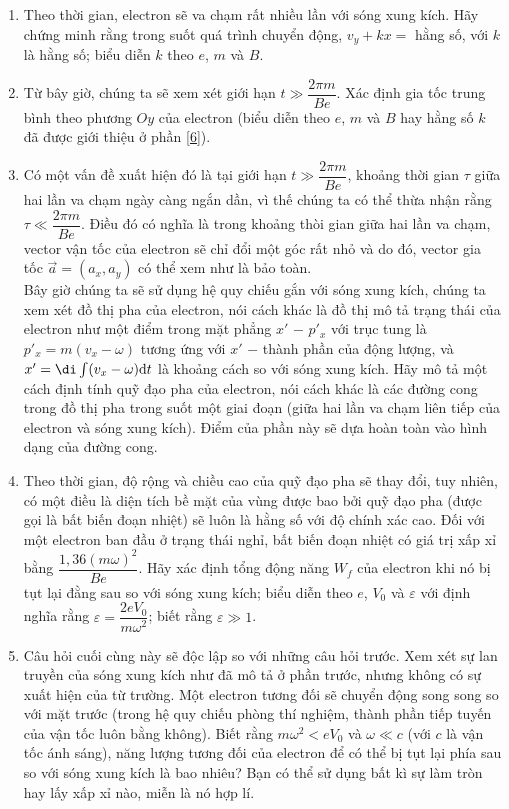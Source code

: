 \begin{vd}
\begin{enumerate}[1)]
    \item Theo thời gian, electron sẽ va chạm rất nhiều lần với sóng xung kích. Hãy chứng minh rằng trong suốt quá trình chuyển động, $v_{y}+kx=$ hằng số, với $k$ là hằng số; biểu diễn $k$ theo $e$, $m$ và $B$.$\label{6}$
    \item Từ bây giờ, chúng ta sẽ xem xét giới hạn $t\gg \dfrac{2\pi m}{Be}$. Xác định gia tốc trung bình theo phương $Oy$ của electron (biểu diễn theo $e$, $m$ và $B$ hay hằng số $k$ đã được giới thiệu ở phần \ref{6}).
    \item Có một vấn đề xuất hiện đó là tại giới hạn $t \gg \dfrac{2\pi m}{Be}$, khoảng thời gian $\tau$ giữa hai lần va chạm ngày càng ngắn dần, vì thế chúng ta có thể thừa nhận rằng $\tau \ll \dfrac{2\pi m}{Be}$. Điều đó có nghĩa là trong khoảng thòi gian giữa hai lần va chạm, vector vận tốc của electron sẽ chỉ đổi một góc rất nhỏ và do đó, vector gia tốc $\overrightarrow{a}=(a_{x},a_{y})$ có thể xem như là bảo toàn.\\
    Bây giờ chúng ta sẽ sử dụng hệ quy chiếu gắn với sóng xung kích, chúng ta xem xét đồ thị pha của electron, nói cách khác là đồ thị mô tả trạng thái của electron như một điểm trong mặt phẳng $x'$ $-$ $p'_{x}$ với trục tung là $p'_{x}=m(v_{x}-\omega)$ tương ứng với $x'$ $-$ thành phần của động lượng, và $x'=\di\int(v_{x}-\omega) \mathrm{d}t$ là khoảng cách so với sóng xung kích. Hãy mô tả một cách định tính quỹ đạo pha của electron, nói cách khác là các đường cong trong đồ thị pha trong suốt một giai đoạn (giữa hai lần va chạm liên tiếp của electron và sóng xung kích). Điểm của phần này sẽ dựa hoàn toàn vào hình dạng của đường cong.
    \item Theo thời gian, độ rộng và chiều cao của quỹ đạo pha sẽ thay đổi, tuy nhiên, có một điều là diện tích bề mặt của vùng được bao bởi quỹ đạo pha (được gọi là bất biến đoạn nhiệt) sẽ luôn là hằng số với độ chính xác cao. Đối với một electron ban đầu ở trạng thái nghỉ, bất biến đoạn nhiệt có giá trị xấp xỉ bằng $\dfrac{1,36(m\omega)^2}{Be}$. Hãy xác định tổng động năng $W_{f}$ của electron khi nó bị tụt lại đằng sau so với sóng xung kích; biểu diễn theo $e$, $V_0$ và $\varepsilon$ với định nghĩa rằng $\varepsilon=\dfrac{2eV_0}{m\omega^2}$;  biết rằng $\varepsilon \gg 1$.
    \item Câu hỏi cuối cùng này sẽ độc lập so với những câu hỏi trước. Xem xét sự lan truyền của sóng xung kích như đã mô tả ở phần trước, nhưng không có sự xuất hiện của từ trường. Một electron tương đối sẽ chuyển động song song so với mặt trước (trong hệ quy chiếu phòng thí nghiệm, thành phần tiếp tuyến của vận tốc luôn bằng không). Biết rằng $m\omega^2<eV_0$ và $\omega \ll c$ (với $c$ là vận tốc ánh sáng), năng lượng tương đối của electron để có thể bị tụt lại phía sau so với sóng xung kích là bao nhiêu? Bạn có thể sử dụng bất kì sự làm tròn hay lấy xấp xỉ nào, miễn là nó hợp lí.
\end{enumerate}
\end{vd}
